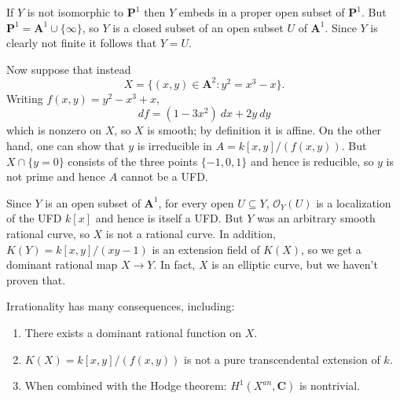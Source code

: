 \documentclass[reqno,12pt,letterpaper]{amsart}
\newcommand{\CC}{\mathbf{C}}
\newcommand{\PP}{\mathbf P}
\newcommand{\Aff}{\mathbf A}
\newcommand{\Olo}{\mathscr O}
\theoremstyle{definition}
\begin{document}
If $Y$ is not isomorphic to $\PP^1$ then $Y$ embeds in a proper open subset of $\PP^1$.
But $\PP^1 = \Aff^1 \cup \{\infty\}$, so $Y$ is a closed subset of an open subset $U$ of $\Aff^1$.
Since $Y$ is clearly not finite it follows that $Y = U$.

Now suppose that instead
$$X = \{(x, y) \in \Aff^2: y^2 = x^3 - x\}.$$
Writing $f(x, y) = y^2 - x^3 + x$,
$$df = (1 - 3x^2) ~dx + 2y ~dy$$
which is nonzero on $X$, so $X$ is smooth; by definition it is affine.
On the other hand, one can show that $y$ is irreducible in $A = k[x, y]/(f(x, y))$.
But $X \cap \{y = 0\}$ consists of the three points $\{-1, 0, 1\}$ and hence is reducible, so $y$ is not prime and hence $A$ cannot be a UFD.

Since $Y$ is an open subset of $\Aff^1$, for every open $U \subseteq Y$, $\Olo_Y(U)$ is a localization of the UFD $k[x]$ and hence is itself a UFD.
But $Y$ was an arbitrary smooth rational curve, so $X$ is not a rational curve.
In addition, $K(Y) = k[x, y]/(xy - 1)$ is an extension field of $K(X)$, so we get a dominant rational map $X \to Y$.
In fact, $X$ is an elliptic curve, but we haven't proven that.

Irrationality has many consequences, including:
\begin{enumerate}
\item There exists a dominant rational function on $X$.
\item $K(X) = k[x, y]/(f(x, y))$ is not a pure transcendental extension of $k$.
\item When combined with the Hodge theorem: $H^1(X^{an}, \CC)$ is nontrivial.
\end{enumerate}




\printbibliography
\end{document}
